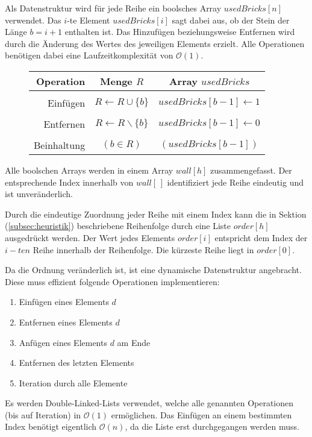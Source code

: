 \documentclass[a4paper, 12pt]{scrartcl}
\begin{document}
Als Datenstruktur wird für jede Reihe ein boolsches Array $usedBricks[n]$ verwendet. Das $i$-te Element $usedBricks[i]$ sagt dabei aus, ob der Stein der Länge $b=i+1$ enthalten ist. Das Hinzufügen beziehungsweise Entfernen wird durch die Änderung des Wertes des jeweiligen Elements erzielt. Alle Operationen benötigen dabei eine Laufzeitkomplexität von $\mathcal{O}(1)$.
\begin{figure}[H]
	\centering
	\begin{tabular}{rcc}
		Operation & \hspace{1cm} Menge $R$ \hspace{1cm} & Array $usedBricks$ \\
		\hline\\
		Einfügen & $R \leftarrow R\cup\{b\}$ & $usedBricks[b-1] \leftarrow 1$ \\\\
		Entfernen & $R \leftarrow R\backslash\{b\}$ & $usedBricks[b-1] \leftarrow 0$ \\\\
		Beinhaltung & $(b \in R)$ & $(usedBricks[b-1])$
	\end{tabular}
\end{figure}
Alle boolschen Arrays werden in einem Array $wall[h]$ zusammengefasst. Der entsprechende Index innerhalb von $wall[\,]$ identifiziert jede Reihe eindeutig und ist unveränderlich.

Durch die eindeutige Zuordnung jeder Reihe mit einem Index kann die in Sektion (\ref{subsec:heuristik}) beschriebene Reihenfolge durch eine Liste $order[h]$ ausgedrückt werden. Der Wert jedes Elements $order[i]$ entspricht dem Index der $i-ten$ Reihe innerhalb der Reihenfolge. Die kürzeste Reihe liegt in $order[0]$.

Da die Ordnung veränderlich ist, ist eine dynamische Datenstruktur angebracht. Diese muss effizient folgende Operationen implementieren:
\begin{enumerate}
	\itemsep-2pt
	\item Einfügen eines Elements $d$
	\item Entfernen eines Elements $d$
	\item Anfügen eines Elements $d$ am Ende
	\item Entfernen des letzten Elements
	\item Iteration durch alle Elemente
\end{enumerate}
Es werden Double-Linked-Lists verwendet, welche alle genannten Operationen (bis auf Iteration) in $\mathcal{O}(1)$ ermöglichen. Das Einfügen an einem bestimmten Index benötigt eigentlich $\mathcal{O}(n)$, da die Liste erst durchgegangen werden muss.
\end{document}

